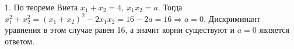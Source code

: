 1. По теореме Виета $x_1+x_2=4,\ x_1x_2=a.$ Тогда $x_1^2+x_2^2=(x_1+x_2)^2-2x_1x_2=16-2a=16\Rightarrow a=0.$ Дискриминант уравнения в этом случае равен 16, а значит корни существуют и $a=0$ является ответом.\\
